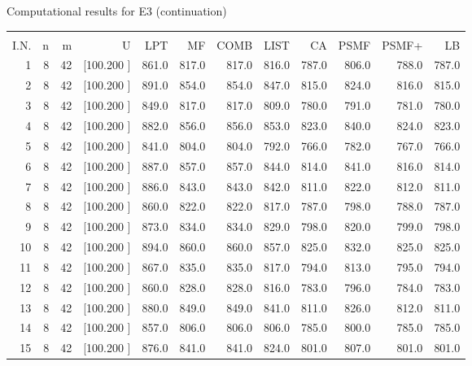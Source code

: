 \documentclass[12pt,a4paper]{article}
\begin{document}
\newpage
\begin{center}
 Computational results for E3 (continuation) {\tiny
\begin{tabular}{r r r r r r r r r r r r}\hline
    &   &   &          &        &        &        &        &        &        &        &       \\[-0.1in]
  I.N.  &  n  &  m  &  U  &  LPT  &  MF  &  COMB  &  LIST  &  CA  & PSMF &PSMF+ & LB \\[0.03in]
\hline
   1&  8& 42&[100.200   ]&   861.0&   817.0&   817.0&   816.0&   787.0&   806.0&   788.0&   787.0\\[-0.02in]
   2&  8& 42&[100.200   ]&   891.0&   854.0&   854.0&   847.0&   815.0&   824.0&   816.0&   815.0\\[-0.02in]
   3&  8& 42&[100.200   ]&   849.0&   817.0&   817.0&   809.0&   780.0&   791.0&   781.0&   780.0\\[-0.02in]
   4&  8& 42&[100.200   ]&   882.0&   856.0&   856.0&   853.0&   823.0&   840.0&   824.0&   823.0\\[-0.02in]
   5&  8& 42&[100.200   ]&   841.0&   804.0&   804.0&   792.0&   766.0&   782.0&   767.0&   766.0\\[-0.02in]
   6&  8& 42&[100.200   ]&   887.0&   857.0&   857.0&   844.0&   814.0&   841.0&   816.0&   814.0\\[-0.02in]
   7&  8& 42&[100.200   ]&   886.0&   843.0&   843.0&   842.0&   811.0&   822.0&   812.0&   811.0\\[-0.02in]
   8&  8& 42&[100.200   ]&   860.0&   822.0&   822.0&   817.0&   787.0&   798.0&   788.0&   787.0\\[-0.02in]
   9&  8& 42&[100.200   ]&   873.0&   834.0&   834.0&   829.0&   798.0&   820.0&   799.0&   798.0\\[-0.02in]
  10&  8& 42&[100.200   ]&   894.0&   860.0&   860.0&   857.0&   825.0&   832.0&   825.0&   825.0\\[-0.02in]
  11&  8& 42&[100.200   ]&   867.0&   835.0&   835.0&   817.0&   794.0&   813.0&   795.0&   794.0\\[-0.02in]
  12&  8& 42&[100.200   ]&   860.0&   828.0&   828.0&   816.0&   783.0&   796.0&   784.0&   783.0\\[-0.02in]
  13&  8& 42&[100.200   ]&   880.0&   849.0&   849.0&   841.0&   811.0&   826.0&   812.0&   811.0\\[-0.02in]
  14&  8& 42&[100.200   ]&   857.0&   806.0&   806.0&   806.0&   785.0&   800.0&   785.0&   785.0\\[-0.02in]
  15&  8& 42&[100.200   ]&   876.0&   841.0&   841.0&   824.0&   801.0&   807.0&   801.0&   801.0\\[-0.02in]

\end{tabular}}
\end{center}
\end{document}
